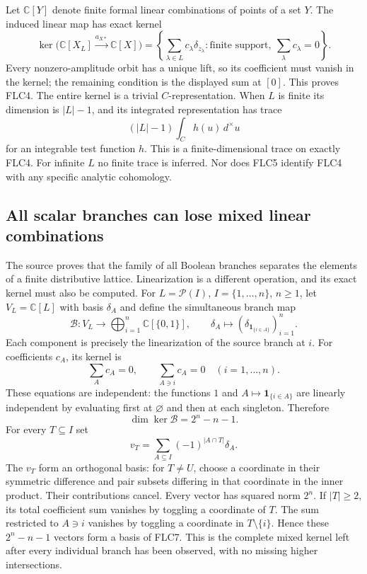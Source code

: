 \documentclass[11pt]{article}
\begin{document}
Let $\mathbb C[Y]$ denote finite formal linear combinations of points
of a set $Y$. The induced linear map has exact kernel
\[
\ker\bigl(\mathbb C[X_L]\xrightarrow{a_{X*}}\mathbb C[X]\bigr)
 =\left\{\sum_{\lambda\in L}c_\lambda\delta_{z_\lambda}:
        \text{finite support},\ \sum_\lambda c_\lambda=0\right\}.
\tag{FLC4}
\]
Every nonzero-amplitude orbit has a unique lift, so its coefficient
must vanish in the kernel; the remaining condition is the displayed
sum at $[0]$. This proves FLC4. The entire kernel is a trivial
$C$-representation. When $L$ is finite its dimension is $|L|-1$,
and its integrated representation has trace
\[
(|L|-1)\int_C h(u)\,d^\times u
\tag{FLC5}
\]
for an integrable test function $h$. This is a finite-dimensional
trace on exactly FLC4. For infinite $L$ no finite trace is inferred.
Nor does FLC5 identify FLC4 with any specific analytic cohomology.

\subsection{All scalar branches can lose mixed linear combinations}
The source proves that the family of all Boolean branches separates
the elements of a finite distributive lattice. Linearization is a
different operation, and its exact kernel must also be computed.
For $L=\mathcal P(I)$, $I=\{1,\ldots,n\}$, $n\ge1$, let
$V_L=\mathbb C[L]$ with basis $\delta_A$ and define the simultaneous
branch map
\[
\mathcal B:V_L\longrightarrow
 \bigoplus_{i=1}^n\mathbb C[\{0,1\}],
\qquad
\delta_A\longmapsto
   (\delta_{\mathbf1_{\{i\in A\}}})_{i=1}^n.
\tag{FLC6}
\]
Each component is precisely the linearization of the source branch
at $i$. For coefficients $c_A$, its kernel is
\[
\sum_A c_A=0,\qquad
\sum_{A\ni i}c_A=0\quad(i=1,\ldots,n).
\tag{FLC7}
\]
These equations are independent: the functions $1$ and
$A\mapsto\mathbf1_{\{i\in A\}}$ are linearly independent by evaluating
first at $\varnothing$ and then at each singleton. Therefore
\[
\dim\ker\mathcal B=2^n-n-1.
\tag{FLC8}
\]
For every $T\subseteq I$ set
\[
v_T=\sum_{A\subseteq I}(-1)^{|A\cap T|}\delta_A.
\tag{FLC9}
\]
The $v_T$ form an orthogonal basis: for $T\ne U$, choose a coordinate
in their symmetric difference and pair subsets differing in that
coordinate in the inner product. Their contributions cancel.
Every vector has squared norm $2^n$. If $|T|\ge2$, its total coefficient
sum vanishes by toggling a coordinate of $T$. The sum restricted to
$A\ni i$ vanishes by toggling a coordinate in $T\setminus\{i\}$.
Hence these $2^n-n-1$ vectors form a basis of FLC7.
This is the complete mixed kernel left after every individual branch
has been observed, with no missing higher intersections.
\end{document}
